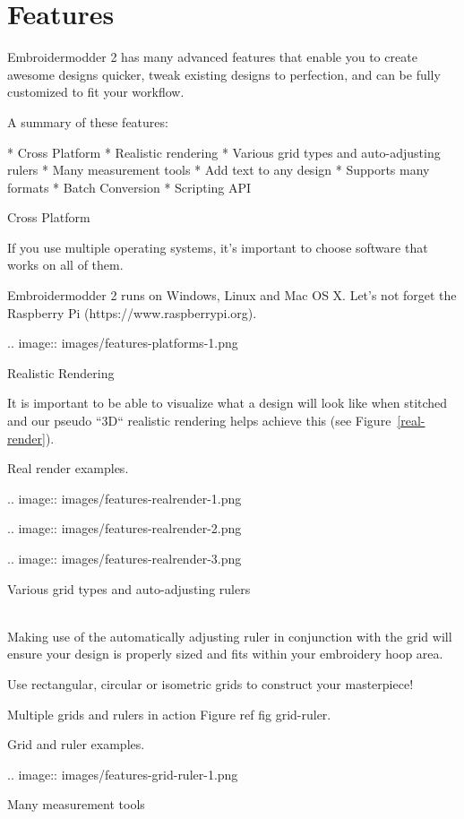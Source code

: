 \documentclass[a4paper]{report}
\begin{document}
\section{Features}

Embroidermodder 2 has many advanced features that enable you to create awesome designs quicker, tweak existing designs to perfection, and can be fully customized to fit your workflow.

A summary of these features:

* Cross Platform
* Realistic rendering
* Various grid types and auto-adjusting rulers
* Many measurement tools
* Add text to any design
* Supports many formats
* Batch Conversion
* Scripting API

Cross Platform
~~~~~~~~~~~~~~

If you use multiple operating systems, it's important to choose software that works on all of them.

Embroidermodder 2 runs on Windows, Linux and Mac OS X. Let's not forget the  Raspberry
Pi (https://www.raspberrypi.org).

.. image::
   images/features-platforms-1.png

Realistic Rendering
~~~~~~~~~~~~~~~~~~~

It is important to be able to visualize what a design will look like when stitched and our
pseudo ``3D`` realistic rendering helps achieve this
(see Figure~\ref{real-render}).

Real render examples.

.. image::
   images/features-realrender-1.png

.. image::
   images/features-realrender-2.png

.. image::
   images/features-realrender-3.png

Various grid types and auto-adjusting rulers
~~~~~~~~~~~~~~~~~~~~~~~~~~~~~~~~~~~~~~~~~~~~

Making use of the automatically adjusting ruler in conjunction with the grid will ensure your
design is properly sized and fits within your embroidery hoop area.

Use rectangular, circular or isometric grids to construct your masterpiece!

Multiple grids and rulers in action Figure ref fig grid-ruler.

Grid and ruler examples.

.. image::
   images/features-grid-ruler-1.png

Many measurement tools
~~~~~~~~~~~~~~~~~~~~~~
\end{document}
